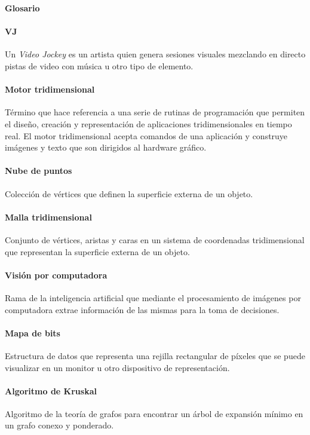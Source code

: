 ﻿\Huge
\textbf{Glosario}

\vspace{10 mm}

\normalsize 

\paragraph{VJ}
Un \emph{Video Jockey} es un artista quien genera sesiones visuales mezclando en directo pistas de video con música u otro tipo de elemento.

\paragraph{Motor tridimensional}
Término que hace referencia a una serie de rutinas de programación que permiten el diseño, creación y representación de aplicaciones tridimensionales en tiempo real.
El motor tridimensional acepta comandos de una aplicación y construye imágenes y texto que son dirigidos al hardware gráfico.
 
\paragraph{Nube de puntos}
Colección de vértices que definen la superficie externa de un objeto.

\paragraph{Malla tridimensional}
Conjunto de vértices, aristas y caras en un sistema de coordenadas tridimensional que representan la superficie externa de un objeto.

\paragraph{Visión por computadora}
Rama de la inteligencia artificial que mediante el procesamiento de imágenes por computadora extrae información de las mismas para la toma de decisiones.

\paragraph{Mapa de bits}
Estructura de datos que representa una rejilla rectangular de píxeles que se puede visualizar en un monitor u otro dispositivo de representación.

\paragraph{Algoritmo de Kruskal}
Algoritmo de la teoría de grafos para encontrar un árbol de expansión mínimo en un grafo conexo y ponderado. 

